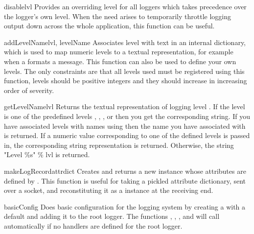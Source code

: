 \begin{funcdesc}{disable}{lvl}
Provides an overriding level  for all loggers which takes
precedence over the logger's own level. When the need arises to
temporarily throttle logging output down across the whole application,
this function can be useful.
\end{funcdesc}

\begin{funcdesc}{addLevelName}{lvl, levelName}
Associates level  with text  in an internal
dictionary, which is used to map numeric levels to a textual
representation, for example when a  formats a message.
This function can also be used to define your own levels. The only
constraints are that all levels used must be registered using this
function, levels should be positive integers and they should increase
in increasing order of severity.
\end{funcdesc}

\begin{funcdesc}{getLevelName}{lvl}
Returns the textual representation of logging level . If the
level is one of the predefined levels ,
, ,  or 
then you get the corresponding string. If you have associated levels
with names using  then the name you have associated
with  is returned. If a numeric value corresponding to one of the
defined levels is passed in, the corresponding string representation is
returned. Otherwise, the string "Level \%s" \% lvl is returned.
\end{funcdesc}

\begin{funcdesc}{makeLogRecord}{attrdict}
Creates and returns a new  instance whose attributes are
defined by . This function is useful for taking a pickled
 attribute dictionary, sent over a socket, and reconstituting
it as a  instance at the receiving end.
\end{funcdesc}

\begin{funcdesc}{basicConfig}{}
Does basic configuration for the logging system by creating a
 with a default  and adding it to
the root logger. The functions , ,
,  and  will call
 automatically if no handlers are defined for the
root logger.
\end{funcdesc}

